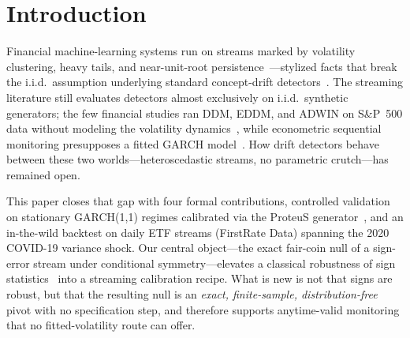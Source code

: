 \documentclass[sigconf,anonymous,review]{acmart}
\theoremstyle{acmdefinition}
\begin{document}
\maketitle

\section{Introduction}\label{sec:intro}

Financial machine-learning systems run on streams marked by volatility clustering, heavy tails, and near-unit-root persistence~\cite{cont_2001, tsay_2010}---stylized facts that break the i.i.d.\ assumption underlying standard concept-drift detectors~\cite{gama_survey_2014, lu_concept_drift_2018}. The streaming literature still evaluates detectors almost exclusively on i.i.d.\ synthetic generators; the few financial studies ran DDM, EDDM, and ADWIN on S\&P~500 data without modeling the volatility dynamics~\cite{neri_2021, cavalcante_2015}, while econometric sequential monitoring presupposes a fitted GARCH model~\cite{horvath_2006, song_kang_2020}. How drift detectors behave between these two worlds---heteroscedastic streams, no parametric crutch---has remained open.

This paper closes that gap with four formal contributions, controlled validation on stationary GARCH(1,1) regimes calibrated via the ProteuS generator~\cite{suarez_cetrulo_proteus_2025}, and an in-the-wild backtest on daily ETF streams (FirstRate Data) spanning the 2020 COVID-19 variance shock. Our central object---the exact fair-coin null of a sign-error stream under conditional symmetry---elevates a classical robustness of sign statistics~\cite{campbell_dufour_1995, christoffersen_diebold_2006} into a streaming calibration recipe. What is new is not that signs are robust, but that the resulting null is an \emph{exact, finite-sample, distribution-free} pivot with no specification step, and therefore supports anytime-valid monitoring that no fitted-volatility route can offer.
\end{document}
